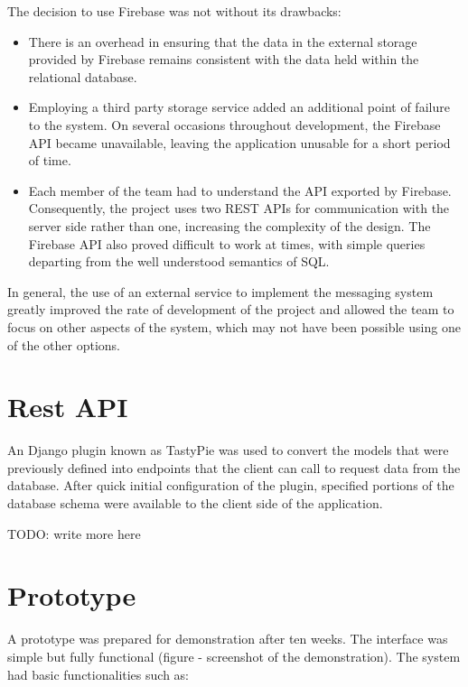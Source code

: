 \documentclass[a4paper]{l3proj}
\begin{document}
The decision to use Firebase was not without its drawbacks:
\begin{itemize}
\item There is an overhead in ensuring that the data in the external storage provided by Firebase remains consistent with the data held within the relational database.
\item Employing a third party storage service added an additional point of failure to the system. On several occasions throughout development, the Firebase API became unavailable, leaving the application unusable for a short period of time.
\item Each member of the team had to understand the API exported by Firebase. Consequently, the project uses two REST APIs for communication with the server side rather than one, increasing the complexity of the design. The Firebase API also proved difficult to work at times, with simple queries departing from the well understood semantics of SQL.
\end{itemize}

In general, the use of an external service to implement the messaging system greatly improved the rate of development of the project and allowed the team to focus on other aspects of the system, which may not have been possible using one of the other options.

\section{Rest API}
\label{restApi}

An Django plugin known as TastyPie was used to convert the models that were previously defined into endpoints that the client can call to request data from the database. After quick initial configuration of the plugin, specified portions of the database schema were available to the client side of the application. 

TODO: write more here
\section{Prototype}
\label{prototype}


A prototype was prepared for demonstration after ten weeks. The interface was simple but fully functional (figure - screenshot of the demonstration). The system had basic functionalities such as: 
\end{document}
